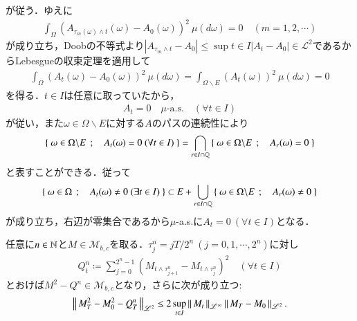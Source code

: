 \begin{prf}
		が従う．ゆえに
		\begin{align}
			\int_\Omega \left( A_{\tau_m(\omega) \wedge t}(\omega) - A_{0}(\omega) \right)^2\ \mu(d\omega) = 0 \quad (m=1,2,\cdots)
		\end{align}
		が成り立ち，Doobの不等式より$|A_{\tau_m \wedge t} - A_{0}| \leq \sup{t \in I}{|A_t - A_{0}|} \in \mathscr{L}^2$であるからLebesgueの収束定理を適用して
		\begin{align}
			\int_\Omega \left( A_t(\omega) - A_{0}(\omega) \right)^2\ \mu(d\omega) 
			= \int_{\Omega \backslash E} \left( A_t(\omega) \right)^2\ \mu(d\omega)
			= 0
		\end{align}
		を得る．$t \in I$は任意に取っていたから，
		\begin{align}
			A_t = 0 \quad \mbox{$\mu$-a.s.} \quad (\forall t \in I)
		\end{align}
		が従い，また$\omega \in \Omega \backslash E$に対する$A$のパスの連続性により
		\begin{align}
			\Set{\omega \in \Omega \backslash E}{A_t(\omega) = 0\ (\forall t \in I)}
			= \bigcap_{r \in I \cap \Q} \Set{\omega \in \Omega \backslash E}{A_r(\omega) = 0}
		\end{align}
		と表すことができる．従って
		\begin{align}
			\left\{\ \omega \in \Omega\ \, ; \quad A_t(\omega) \neq 0\ (\exists t \in I)\ \right\}
			\subset E + \bigcup_{r \in I \cap \mathbb{Q}} \left\{\ \omega \in \Omega \backslash E\ \, ; \quad A_r(\omega) \neq 0\ \right\}
		\end{align}
		が成り立ち，右辺が零集合であるから$\mu$-a.s.に$A_t = 0\ (\forall t \in I)$となる．
		\QED
	\end{prf}
	
	\begin{screen}
		\begin{lem}[二次変分補題]
			任意に$n \in \mathbb{N}$と$M \in \mathcal{M}_{b,c}$を取る．$\tau_j^n = jT/2^n\ (j=0,1,\cdots,2^n)$に対し
			\begin{align}
				Q_t^n \coloneqq \sum_{j=0}^{2^n-1} \left( M_{t \wedge \tau_{j+1}^n} - M_{t \wedge \tau_j^n} \right)^2 \quad (\forall t \in I)
				\label{eq:lem_quadratic_variation_0}
			\end{align}
			とおけば$M^2 - Q^n \in \mathcal{M}_{b,c}$となり，さらに次が成り立つ:
			\begin{align}
				\left\|\, M_T^2 - M_0^2 - Q_T^n\, \right\|_{\mathscr{L}^2} \leq 2 \operatorname*{sup}_{t \in I} \left\|\, M_t\, \right\|_{\mathscr{L}^\infty} \left\|\, M_T - M_0\, \right\|_{\mathscr{L}^2}.
			\end{align}
			\label{lem:quadratic_variation}
		\end{lem}
	\end{screen}
	
